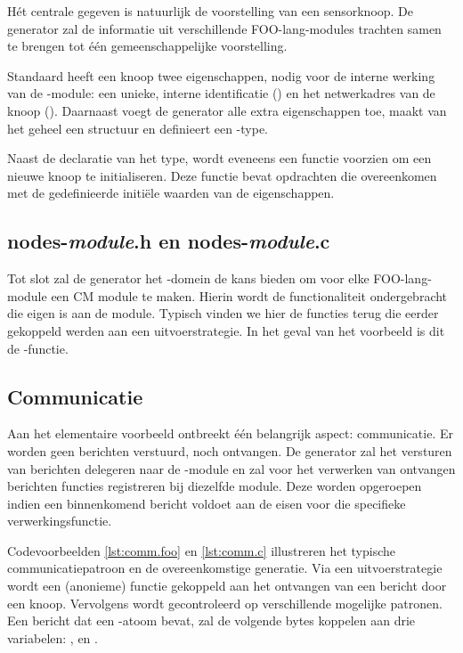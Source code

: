 H\'et centrale gegeven is natuurlijk de voorstelling van een sensorknoop. De
generator zal de informatie uit verschillende FOO-lang-modules trachten samen
te brengen tot \'e\'en gemeenschappelijke voorstelling.

Standaard heeft een knoop twee eigenschappen, nodig voor de interne werking van
de -module: een unieke, interne identificatie () en het
netwerkadres van de knoop (). Daarnaast voegt de generator alle
extra eigenschappen toe, maakt van het geheel een structuur en definieert een
-type.

Naast de declaratie van het type, wordt eveneens een functie voorzien om een
nieuwe knoop te initialiseren. Deze functie bevat opdrachten die overeenkomen
met de gedefinieerde initi\"ele waarden van de eigenschappen.

\subsection{nodes-\emph{module}.h en nodes-\emph{module}.c}

Tot slot zal de generator het -domein de kans bieden om voor elke
FOO-lang-module een CM module te maken. Hierin wordt de functionaliteit
ondergebracht die eigen is aan de module. Typisch vinden we hier de functies
terug die eerder gekoppeld werden aan een uitvoerstrategie. In het geval van
het voorbeeld is dit de -functie.

\subsection{Communicatie}

Aan het elementaire voorbeeld ontbreekt \'e\'en belangrijk aspect:
communicatie. Er worden geen berichten verstuurd, noch ontvangen. De generator
zal het versturen van berichten delegeren naar de -module en zal
voor het verwerken van ontvangen berichten functies registreren bij diezelfde
module. Deze worden opgeroepen indien een binnenkomend bericht voldoet aan de
eisen voor die specifieke verwerkingsfunctie.

Codevoorbeelden \ref{lst:comm.foo} en \ref{lst:comm.c} illustreren het typische
communicatiepatroon en de overeenkomstige generatie. Via een uitvoerstrategie
wordt een (anonieme) functie gekoppeld aan het ontvangen van een bericht door
een knoop. Vervolgens wordt gecontroleerd op verschillende mogelijke patronen.
Een bericht dat een -atoom bevat, zal de volgende bytes koppelen
aan drie variabelen: ,  en .

